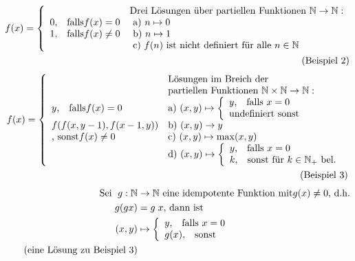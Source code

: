\begin{compactitem}
\begin{align*}
	f(x) = 
	\left\lbrace\begin{array}{l l}
	&\text{Drei Lösungen über partiellen Funktionen } \mathbb{N} \rightarrow \mathbb{N}:\\
	0\text{,} \quad\text{falls} f(x)=0 &\text{ a) } n \mapsto 0\\
	1\text{,} \quad\text{falls} f(x)\neq0 &\text{ b) } n \mapsto 1\\
	&\text{ c) } f(n) \text{ ist nicht definiert für alle } n \in \mathbb{N}\\
	\end{array}\right.\\\tag{Beispiel 2}\\
	\end{align*}
	\begin{align*}
	f(x) = 
	\left\lbrace\begin{array}{l l}
	&\text{Lösungen im Breich der}\\
	&\text{partiellen Funktionen } \mathbb{N} \times \mathbb{N} \rightarrow \mathbb{N}:\\
	y\text{,} \quad\text{falls} f(x)=0 &\text{a) } (x,y) \mapsto
		\left\lbrace\begin{array}{l l}
		y\text{,} \quad\text{falls } x=0\\
		\text{undefiniert sonst}\\ 
		\end{array}\right.\\
	f(f(x,y-1), f(x-1,y)) &\text{b) } (x,y) \rightarrow y\\
	\text{, sonst} f(x)\neq 0 &\text{c) } (x,y) \mapsto \max(x,y)\\
	&\text{d) } (x,y) \mapsto 
		\left\lbrace\begin{array}{l l}
		y\text{,} \quad\text{falls } x=0\\
		k\text{,} \quad\text{sonst für } k \in \mathbb{N}_+ \text{ bel.}\\ 
		\end{array}\right.\\
	\end{array}\right.\\\tag{Beispiel 3}\\
	\end{align*}
	\begin{align*}
	\text{Sei }\;g: \mathbb{N} &\rightarrow \mathbb{N} \text{ eine idempotente Funktion mit} g(x) \neq 0 \text{, d.h.}\\
	g(g x) &= g \; x \text{, dann ist}\\
	(x,y) &\mapsto 
		\left\lbrace\begin{array}{l l}
		y\text{,} \quad\text{falls } x=0\\
		g(x)\text{,} \quad\text{sonst }\\ 
		\end{array}\right. \\\tag{eine Lösung zu Beispiel 3}\\
	\end{align*}
\end{compactitem}

